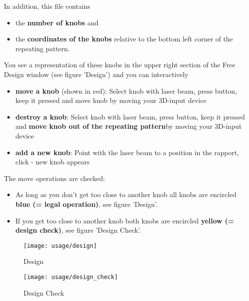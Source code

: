 \begin{itemize}
In addition, this file contains 
	\begin{itemize}
	\item the {\bf number of knobs} and 
	\item the {\bf coordinates of the knobs} relative to
	the bottom left corner of the repeating pattern. 
	\end{itemize}
You see a representation of these knobs in the upper right section of the 
Free Design window (see figure 'Design') and you can interactively 
	\begin{itemize}
	\item {\bf move a knob} (shown in red):\newline
	Select knob with laser beam, press button, keep it pressed and move knob by moving
	your 3D-input device
	\item {\bf destroy a knob}:\newline
	Select knob with laser beam, press button, keep it pressed 
	and {\bf move knob out of the repeating pattern}by moving
	your 3D-input device 
	\item {\bf add a new knob}:\newline
	Point with the laser beam to a position in the rapport, click 
	- new knob appears 
	\end{itemize}
The move operations are checked:	 
	\begin{itemize}
	\item As long as you don't get too close to another knob 
	all knobs are encircled \newline 
        {\bf blue (= legal operation)}, see figure 'Design'. 
	\item If you get too close to another knob both knobs are encircled \newline 
	{\bf yellow (= design check)}, see figure 'Design Check'. 
        \end{itemize}
\end{itemize} 

\begin{figure}[!Hhtp]
  \begin{center}
   \texttt{[image: usage/design]}
   \caption{Design}
  \end{center}
\end{figure}

\begin{figure}[!Hhtp]
  \begin{center}
   \texttt{[image: usage/design\_check]}
   \caption{Design Check}
  \end{center}
\end{figure}
\clearpage

